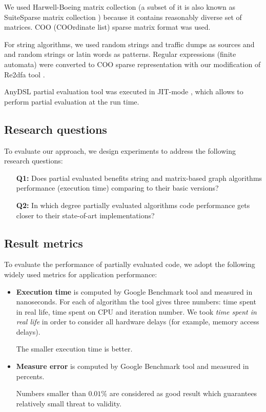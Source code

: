 \documentclass[conference]{IEEEtran}
\begin{document}
We used Harwell-Boeing matrix collection \cite{duff1992users} (a subset of it is also known as SuiteSparse matrix collection \cite{davis2011university}) because it contains reasonably diverse set of matrices. COO (COOrdinate list) sparse matrix format was used.

For string algorithms, we used random strings and traffic dumps as sources and and random strings or latin words as patterns. Regular expressions (finite automata) were converted to COO sparse representation with our modification of Re2dfa tool \cite{re2dfa}.

AnyDSL partial evaluation tool was executed in JIT-mode \colorbox{red}{\cite{leissa2018anydsl}}, which allows to perform partial evaluation at the run time.



\subsection{Research questions}

To evaluate our approach, we design experiments to address the following research questions:

\begin{itemize}
	\item[\textbf{Q1:}] Does partial evaluated benefits string and matrix-based graph algorithms performance (execution time) comparing to their basic versions?
	\item[\textbf{Q2:}] In which degree partially evaluated algorithms code performance gets closer to their state-of-art implementations?
\end{itemize}

\subsection{Result metrics}
To evaluate the performance of partially evaluated code, we adopt the following widely used metrics for application performance:
\begin{itemize}
	\item \textbf{Execution time} is computed by Google Benchmark tool and measured in nanoseconds. For each of algorithm the tool gives three numbers: time spent in real life, time spent on CPU and iteration number. We took \textit{time spent in real life} in order to consider all hardware delays (for example, memory access delays).
	
	The smaller execution time is better.
	
	\item \textbf{Measure error} is computed by Google Benchmark tool and measured in percents. 
	
	Numbers smaller than $0.01\%$ are considered as good result which guarantees relatively small threat to validity.

\end{itemize}
\end{document}
